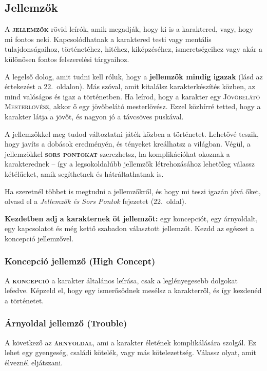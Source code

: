 \documentclass[oneside]{book}
\newcommand{\page}[1]{#1.~oldal}
\newcommand{\onpage}[1]{#1.~oldalon}
\newcommand{\aspect}[1]{\textsc{#1}}
\newcommand{\definition}[1]{\textbf{\textsc{#1}}}
\begin{document}
\subsection{Jellemzők}

A \definition{jellemzők} rövid leírók, amik megadják, hogy ki is a karaktered, vagy, hogy mi fontos neki. Kapcsolódhatnak a karaktered testi vagy mentális tulajdonságaihoz, történetéhez, hitéhez, kiképzéséhez, ismeretségeihez vagy akár a különösen fontos felszerelési tárgyaihoz.

\newpage

A legelső dolog, amit tudni kell róluk, hogy a \textbf{jellemzők mindig igazak} (lásd az értekezést a \onpage{22}). Más szóval, amit kitalálsz karakterkészítés közben, az mind valóságos és igaz a történetben. Ha leírod, hogy a karakter egy \aspect{Jövőbelátó Mesterlövész}, akkor ő egy jövőbelátó mesterlövész. Ezzel közhírré tetted, hogy a karakter látja a jövőt, és nagyon jó a távcsöves puskával.

A jellemzőkkel meg tudod változtatni játék közben a történetet. Lehetővé teszik, hogy javíts a dobások eredményén, és tényeket kreálhatsz a világban. Végül, a jellemzőkkel \definition{sors pontokat} szerezhetsz, ha komplikációkat okoznak a karakterednek – így a legsokoldalúbb jellemzők létrehozásához lehetőleg válassz kétélűeket, amik segíthetnek és hátráltathatnak is.

Ha szeretnél többet is megtudni a jellemzőkről, és hogy mi teszi igazán jóvá őket, olvasd el a \emph{Jellemzők és Sors Pontok} fejezetet (\page{22}).

\textbf{Kezdetben adj a karakternek öt jellemzőt:} egy koncepciót, egy árnyoldalt, egy kapcsolatot és még kettő szabadon választott jellemzőt. Kezdd az egészet a koncepció jellemzővel.

\subsubsection{Koncepció jellemző (High Concept)}

A \definition{koncepció} a karakter általános leírása, csak a leglényegesebb dolgokat lefedve. Képzeld el, hogy egy ismerősödnek mesélsz a karakterről, és így kezdenéd a történetet.

\subsubsection{Árnyoldal jellemző (Trouble)}

A következő az \definition{árnyoldal}, ami a karakter életének komplikálására szolgál. Ez lehet egy gyengeség, családi kötelék, vagy más kötelezettség. Válassz olyat, amit élveznél eljátszani.
\end{document}
